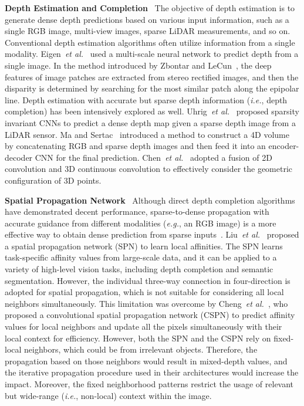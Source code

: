 \documentclass[runningheads]{llncs}
\newcommand{\ie}{\textit{i.e.}}
\newcommand{\eg}{\textit{e.g.}}
\newcommand{\etal}{\textit{et al.}}
\begin{document}
\noindent\textbf{Depth Estimation and Completion} \ 
The objective of depth estimation is to generate dense depth predictions based on various input information, such as a single RGB image, multi-view images, sparse LiDAR measurements, and so on. 
Conventional depth estimation algorithms often utilize information from a single modality. 
Eigen~\etal~\cite{eigen2014depth} used a multi-scale neural network to predict depth from a single image. 
In the method introduced by Zbontar and LeCun~\cite{zbontar2016stereo}, the deep features of image patches are extracted from stereo rectified images, and then the disparity is determined by searching for the most similar patch along the epipolar line. 
Depth estimation with accurate but sparse depth information (\ie, depth completion) has been intensively explored as well. 
Uhrig~\etal~\cite{uhrig2017sparsity} proposed sparsity invariant CNNs to predict a dense depth map given a sparse depth image from a LiDAR sensor. 
Ma and Sertac~\cite{ma2018sparse} introduced a method to construct a 4D volume by concatenating RGB and sparse depth images and then feed it into an encoder-decoder CNN for the final prediction. 
Chen~\etal~\cite{chen2019learning} adopted a fusion of 2D convolution and 3D continuous convolution to effectively consider the geometric configuration of 3D points.


\noindent\textbf{Spatial Propagation Network} \ 
Although direct depth completion algorithms have demonstrated decent performance, sparse-to-dense propagation with accurate guidance from different modalities (\eg, an RGB image) is a more effective way to obtain dense prediction from sparse inputs~\cite{cheng2018depth,xu2019depth,levin2006closed,park2017unified}. 
Liu~\etal~\cite{liu2017learning} proposed a spatial propagation network (SPN) to learn local affinities. 
The SPN learns task-specific affinity values from large-scale data, and it can be applied to a variety of high-level vision tasks, including depth completion and semantic segmentation. 
However, the individual three-way connection in four-direction is adopted for spatial propagation, which is not suitable for considering all local neighbors simultaneously. 
This limitation was overcome by Cheng~\etal~\cite{cheng2018depth}, who proposed a convolutional spatial propagation network (CSPN) to predict affinity values for local neighbors and update all the pixels simultaneously with their local context for efficiency. 
However, both the SPN and the CSPN rely on fixed-local neighbors, which could be from irrelevant objects. 
Therefore, the propagation based on those neighbors would result in mixed-depth values, and the iterative propagation procedure used in their architectures would increase the impact. 
Moreover, the fixed neighborhood patterns restrict the usage of relevant but wide-range (\textit{i.e.}, non-local) context within the image.
\end{document}
